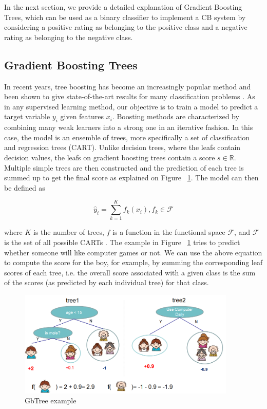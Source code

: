 \documentclass[cic,tc,english]{iiufrgs}
\begin{document}
In the next section, we provide a detailed explanation of Gradient Boosting Trees, which can be used as a binary classifier to implement a CB system by considering a positive rating as belonging to the positive class and a negative rating as belonging to the negative class.

\subsection{Gradient Boosting Trees}
In recent years, tree boosting has become an increasingly popular method and been shown to give state-of-the-art results for many classification problems \cite{Li2012}. As in any supervised learning method, our objective is to train a model to predict a target variable $y_i$ given features $x_i$. Boosting methods are characterized by combining many weak learners into a strong one in an iterative fashion. In this case, the model is an ensemble of trees, more specifically a set of classification and regression trees (CART). Unlike decision trees, where the leafs contain decision values, the leafs on gradient boosting trees contain a score $s \in \mathbb{R}$. Multiple simple trees are then constructed and the prediction of each tree is summed up to get the final score as explained on Figure ~\ref{fig:ex1}. The model can then be defined as

$$\hat{y}_i = \sum_{k=1}^K f_k(x_i), f_k \in \mathcal{F}$$

\noindent where \(K\) is the number of trees, \(f\) is a function in the functional space $\mathcal{F}$, and $\mathcal{F}$ is the set of all possible CARTs \cite{Chen2016}. The example in Figure ~\ref{fig:ex1} tries to predict whether someone will like computer games or not. We can use the above equation to compute the score for the boy, for example, by summing the corresponding leaf scores of each tree, i.e. the overall score associated with a given class is the sum of the scores (as predicted by each individual tree) for that class.

\begin{figure}[ht!]
    \caption{GbTree example}
    \begin{center}
        \includegraphics[width=28em]{twocart}
    \end{center}
    \label{fig:ex1}
\end{figure}
\end{document}
